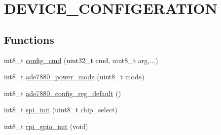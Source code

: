 \hypertarget{a00005}{\section{D\-E\-V\-I\-C\-E\-\_\-\-C\-O\-N\-F\-I\-G\-E\-R\-A\-T\-I\-O\-N}
\label{dd/dad/a00005}
}








  


\subsection*{Functions}
\begin{DoxyCompactItemize}
\item 
int8\-\_\-t \hyperlink{a00005_ga369ee0e8379941cbc2c79b90ec3292da}{config\-\_\-cmd} (uint32\-\_\-t cmd, uint8\-\_\-t arg,...)
\begin{DoxyCompactList}\small\item\em 

 \end{DoxyCompactList}\item 
int8\-\_\-t \hyperlink{a00005_gae9a5abd4e5054e7ea3f149b1764f2cd0}{ade7880\-\_\-power\-\_\-mode} (uint8\-\_\-t mode)
\begin{DoxyCompactList}\small\item\em 

 \end{DoxyCompactList}\item 
int8\-\_\-t \hyperlink{a00005_ga7782772c18e6ea515dcd28dcaedd0f06}{ade7880\-\_\-config\-\_\-reg\-\_\-default} ()
\begin{DoxyCompactList}\small\item\em 

 \end{DoxyCompactList}\end{DoxyCompactItemize}
\begin{DoxyCompactItemize}
\item 
int8\-\_\-t \hyperlink{a00005_ga96ddfd5c89b80852982ba50dd18256f6}{spi\-\_\-init} (uint8\-\_\-t chip\-\_\-select)
\begin{DoxyCompactList}\small\item\em 

 \end{DoxyCompactList}\end{DoxyCompactItemize}
\begin{DoxyCompactItemize}
\item 
int8\-\_\-t \hyperlink{a00005_ga156b48448f55534a2f9c805a1f760efa}{rpi\-\_\-gpio\-\_\-init} (void)
\begin{DoxyCompactList}\small\item\em 

 \end{DoxyCompactList}\end{DoxyCompactItemize}


